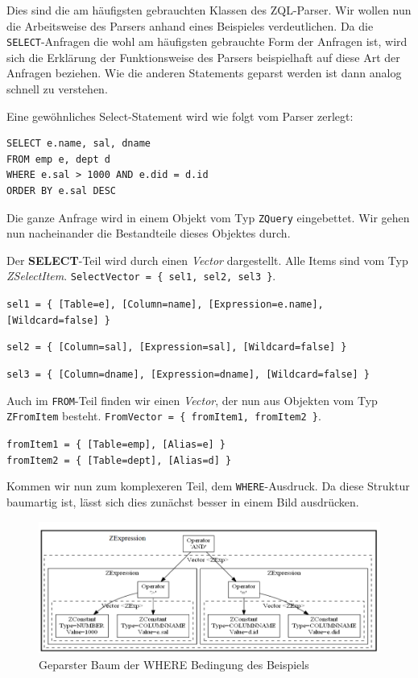 Dies sind die am häufigsten gebrauchten Klassen des ZQL-Parser. Wir wollen nun die Arbeitsweise des Parsers anhand eines Beispieles verdeutlichen. Da die \verb|SELECT|-Anfragen die wohl am häufigsten gebrauchte Form der Anfragen ist, wird sich die Erklärung der Funktionsweise des Parsers beispielhaft auf diese Art der Anfragen beziehen. Wie die anderen Statements geparst werden ist dann analog schnell zu verstehen.


Eine gewöhnliches Select-Statement wird wie folgt vom Parser zerlegt:
\begin{verbatim}
SELECT e.name, sal, dname 
FROM emp e, dept d 
WHERE e.sal > 1000 AND e.did = d.id 
ORDER BY e.sal DESC\end{verbatim}

Die ganze Anfrage wird in einem Objekt vom Typ \verb|ZQuery| eingebettet. Wir gehen nun nacheinander die Bestandteile dieses Objektes durch. 

Der \textbf{SELECT}-Teil wird durch einen \textit{Vector} dargestellt. Alle Items sind vom Typ \textit{ZSelectItem}. \verb|SelectVector = { sel1, sel2, sel3 }|.

\verb|sel1 = { [Table=e], [Column=name], [Expression=e.name], [Wildcard=false] }|

\verb|sel2 = { [Column=sal], [Expression=sal], [Wildcard=false] }|

\verb|sel3 = { [Column=dname], [Expression=dname], [Wildcard=false] }|

Auch im \verb|FROM|-Teil finden wir einen \textit{Vector}, der nun aus Objekten vom Typ \verb|ZFromItem| besteht. \verb|FromVector = { fromItem1, fromItem2 }|.

\verb|fromItem1 = { [Table=emp], [Alias=e] }|\\
\verb|fromItem2 = { [Table=dept], [Alias=d] }|

Kommen wir nun zum komplexeren Teil, dem \verb|WHERE|-Ausdruck. Da diese Struktur baumartig ist, lässt sich dies zunächst besser in einem Bild ausdrücken.

\begin{figure}[h]
\centering
\includegraphics[scale=0.51]{Bilder/where_teil.png}
\caption{Geparster Baum der WHERE Bedingung des Beispiels}
\label{fig:parseTree}
\end{figure}

